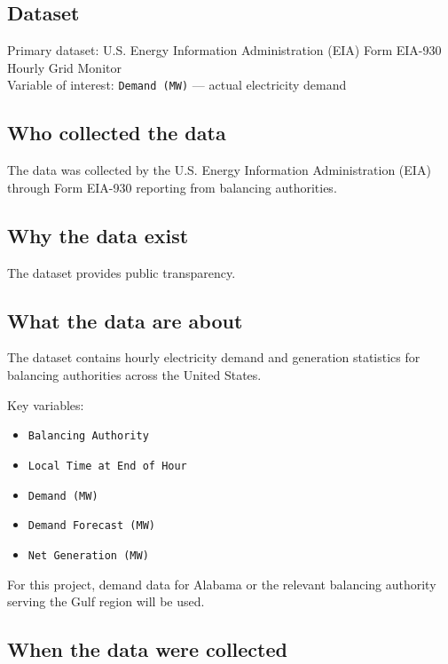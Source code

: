 \documentclass[
  letterpaper,
  DIV=11,
  numbers=noendperiod]{scrreprt}
\providecommand{\tightlist}{%
  \setlength{\itemsep}{0pt}\setlength{\parskip}{0pt}}
\begin{document}
\subsection{Dataset}\label{dataset-1}

Primary dataset: U.S. Energy Information Administration (EIA) Form
EIA-930 Hourly Grid Monitor\\
Variable of interest: \texttt{Demand\ (MW)} --- actual electricity
demand

\subsection{Who collected the data}\label{who-collected-the-data-1}

The data was collected by the U.S. Energy Information Administration
(EIA) through Form EIA-930 reporting from balancing authorities.

\subsection{Why the data exist}\label{why-the-data-exist}

The dataset provides public transparency.

\subsection{What the data are about}\label{what-the-data-are-about}

The dataset contains hourly electricity demand and generation statistics
for balancing authorities across the United States.

Key variables:

\begin{itemize}
\tightlist
\item
  \texttt{Balancing\ Authority}
\item
  \texttt{Local\ Time\ at\ End\ of\ Hour}
\item
  \texttt{Demand\ (MW)}
\item
  \texttt{Demand\ Forecast\ (MW)}
\item
  \texttt{Net\ Generation\ (MW)}
\end{itemize}

For this project, demand data for Alabama or the relevant balancing
authority serving the Gulf region will be used.

\subsection{When the data were
collected}\label{when-the-data-were-collected}
\end{document}
